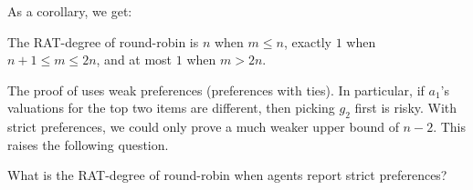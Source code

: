 As a corollary, we get:
\begin{theorem}
The RAT-degree of round-robin is $n$ when $m\leq n$, exactly $1$ when $n+1\leq m\leq 2n$, and at most $1$ when $m> 2n$.
\end{theorem}
    
\iffalse
We show that even the slight increase to $m=n+1$ makes a significant difference: in this case, the degree drops to at most $n-2$ -- meaning that there exists an agent who can safely manipulate the outcome, even in the presence of an unknown agent.

\eden{I think the degree depends on the agent's preferences -- on how many of its most preferred items she is willing to risk in order to get her "best-in-the-middle" - something like that.. }

    





\fi

The proof of  uses weak preferences (preferences with ties). In particular, if $a_1$'s valuations for the top two items are different, then picking $g_2$ first is risky.
With strict preferences, we could only prove a much weaker upper bound of $n-2$. This raises the following question.
\begin{open}
    What is the RAT-degree of round-robin when agents  report strict preferences?
\end{open}


